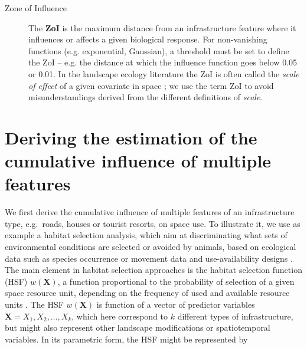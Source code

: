 \documentclass[titlepage]{article}
\begin{document}
\begin{tcolorbox}[width=1.3\textwidth,center,colback=yellow!5,colframe=yellow!75!black,title={Box 1 -- Definitions}]
\begin{description}
    \item[Zone of Influence] The \textbf{ZoI} is the maximum distance from an infrastructure feature where it influences or affects a given biological response. For non-vanishing functions (e.g. exponential, Gaussian), a threshold must be set to define the ZoI -- e.g. the distance at which the influence function goes below 0.05 or 0.01. 
    In the landscape ecology literature the ZoI is often called the \textit{scale of effect} of a given covariate in space \citep[e.g.][]{jackson_are_2015}; we use the term ZoI to avoid misunderstandings derived from the different definitions of \textit{scale}. 
    

\end{description}
\end{tcolorbox}

\section{Deriving the estimation of the cumulative influence of multiple features}

We first derive the cumulative influence of multiple features of an infrastructure type, e.g.\ roads, houses or tourist resorts, on space use. To illustrate it, we use as example a habitat selection analysis, which aim at discriminating what sets of environmental conditions are selected or avoided by animals, based on ecological data such as species occurrence or movement data and use-availability designs \citep{fieberg_how_2021}. The main element in habitat selection approaches is the habitat selection function (HSF) $w(\textbf{X})$, a function proportional to the probability of selection of a given space resource unit, depending on the frequency of used and available resource units \citep{thurfjell_applications_2014}. The HSF $w(\textbf{X})$ is function of a vector of predictor variables $\textbf{X} = X_1,X_2, ...,  X_k$, which here correspond to $k$ different types of infrastructure, but might also represent other landscape modifications or spatiotemporal variables. In its parametric form, the HSF might be represented by
\end{document}
